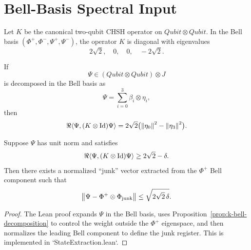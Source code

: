 \section{Bell-Basis Spectral Input}

\begin{proposition}
\label{prop:bell-spectrum}
Let $K$ be the canonical two-qubit CHSH operator on $Qubit \otimes Qubit$.
In the Bell basis $(\Phi^+, \Phi^-, \Psi^+, \Psi^-)$, the operator $K$ is diagonal with eigenvalues
\[
2\sqrt{2}, \quad 0, \quad 0, \quad -2\sqrt{2}.
\]
\end{proposition}

\begin{proposition}
\label{prop:k-bell-decomposition}
If
\[
\Psi \in (Qubit \otimes Qubit) \otimes J
\]
is decomposed in the Bell basis as
\[
\Psi = \sum_{i=0}^3 \beta_i \otimes \eta_i,
\]
then
\[
\Re \langle \Psi, (K \otimes \mathrm{Id})\Psi \rangle
= 2\sqrt{2}\bigl(\left\lVert \eta_0 \right\rVert^2 - \left\lVert \eta_3 \right\rVert^2\bigr).
\]
\end{proposition}

\begin{theorem}
\label{thm:spectral-state-extraction}
Suppose $\Psi$ has unit norm and satisfies
\[
\Re \langle \Psi, (K \otimes \mathrm{Id})\Psi \rangle \ge 2\sqrt{2} - \delta.
\]
Then there exists a normalized ``junk'' vector extracted from the $\Phi^+$ Bell component such that
\[
\left\lVert \Psi - \Phi^+ \otimes \Phi_{\mathrm{junk}} \right\rVert
\le \sqrt{2\sqrt{2}\,\delta}.
\]
\end{theorem}

\begin{proof}
The Lean proof expands $\Psi$ in the Bell basis, uses Proposition~\ref{prop:k-bell-decomposition} to control the weight outside the $\Phi^+$ eigenspace, and then normalizes the leading Bell component to define the junk register.
This is implemented in `StateExtraction.lean`.
\end{proof}
